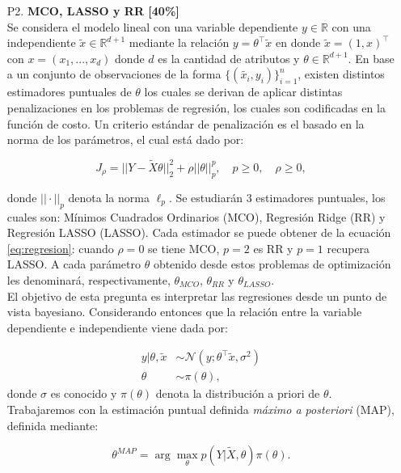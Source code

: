 \documentclass[letterpaper,11pt]{article}
\theoremstyle{plain}
\theoremstyle{definition}
\newcommand{\1}{\mathbbm{1}}
\begin{document}
\begin{enumerate}
\item [P2.] \textbf{MCO, LASSO y RR [40\%]}\\

Se considera el modelo lineal con una variable dependiente $y\in\mathbb{R}$ con una independiente $\widetilde{x}\in\mathbb{R}^{d+1}$ mediante la relación $y = \theta^\top \widetilde{x}$ en donde $\widetilde{x} = (1,x)^\top$ con $x = (x_1,...,x_d)$ donde $d$ es la cantidad de atributos y $\theta\in\mathbb{R}^{d+1}$. En base a un conjunto de observaciones de la forma $\{(\widetilde{x_i}, y_i)\}_{i=1}^n$, existen distintos estimadores puntuales de $\theta$ los cuales se derivan de aplicar distintas penalizaciones en los problemas de regresión, los cuales son codificadas en la función de costo. Un criterio estándar de penalización es el basado en la norma de los parámetros, el cual está dado por:

\begin{equation}
    J_\rho = || Y-\widetilde{X}\theta ||^2_2  + \rho ||\theta||^p_p, \quad p\geq 0, \quad \rho\geq 0,
    \label{eq:regresion}
\end{equation}

donde $||\cdot||_p$ denota la norma $\mathbb{\ell}_p$. Se estudiarán 3 estimadores puntuales, los cuales son: Mínimos Cuadrados Ordinarios (MCO), Regresión Ridge (RR) y Regresión LASSO (LASSO). Cada estimador se puede obtener de la ecuación \eqref{eq:regresion}: cuando $\rho = 0$ se tiene MCO, $p=2$ es RR y $p=1$ recupera LASSO. A cada parámetro $\theta$ obtenido desde estos problemas de optimización  les denominará, respectivamente,  $\theta_{MCO}$, $\theta_{RR}$ y $\theta_{LASSO}$. \\

El objetivo de esta pregunta es interpretar las regresiones desde un punto de vista bayesiano. Considerando entonces que la relación entre la variable dependiente e independiente viene dada por:

\begin{align}
    y|\theta,\widetilde{x}&\sim\mathcal{N}(y;\theta^\top \widetilde{x}, \sigma^2)\\
    \theta&\sim\pi(\theta),
\end{align}
donde $\sigma$ es conocido y $\pi(\theta)$ denota la distribución a priori de $\theta$. Trabajaremos con la estimación puntual definida \emph{máximo a posteriori} (MAP), definida mediante:

\begin{equation}
    \theta^{MAP} = \arg\max_\theta p(Y|\widetilde{X},\theta )\pi(\theta).
    \label{eq:map}
\end{equation}


\end{enumerate}
\end{document}
